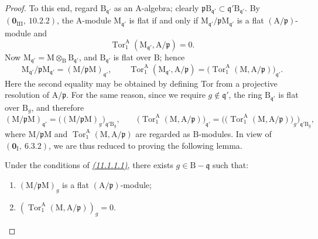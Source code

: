 \begin{proof}
To this end, regard $\mathrm{B}_{\mathfrak{q}'}$ as an $\mathrm{A}$-algebra; clearly
$\mathfrak{p}\mathrm{B}_{\mathfrak{q}'}\subset
\mathfrak{q}'\mathrm{B}_{\mathfrak{q}'}$. By
$(\mathbf{0}_{\mathrm{III}},~10.2.2)$, the $\mathrm{A}$-module
$\mathrm{M}_{\mathfrak{q}'}$ is flat if and only if
$\mathrm{M}_{\mathfrak{q}'}/\mathfrak{p}\mathrm{M}_{\mathfrak{q}'}$ is a
flat $(\mathrm{A}/\mathfrak{p})$-module and
\[
  \operatorname{Tor}_1^\mathrm{A}
  (\mathrm{M}_{\mathfrak{q}'},\mathrm{A}/\mathfrak{p})=0.
\]
Now $\mathrm{M}_{\mathfrak{q}'}=
\mathrm{M}\otimes_{\mathrm{B}}\mathrm{B}_{\mathfrak{q}'}$, and
$\mathrm{B}_{\mathfrak{q}'}$ is flat over $\mathrm{B}$; hence
\[
  \mathrm{M}_{\mathfrak{q}'}/\mathfrak{p}\mathrm{M}_{\mathfrak{q}'}
    =(\mathrm{M}/\mathfrak{p}\mathrm{M})_{\mathfrak{q}'},
  \qquad
  \operatorname{Tor}_1^\mathrm{A}
  (\mathrm{M}_{\mathfrak{q}'},\mathrm{A}/\mathfrak{p})
    =\bigl(\operatorname{Tor}_1^\mathrm{A}
      (\mathrm{M},\mathrm{A}/\mathfrak{p})\bigr)_{\mathfrak{q}'}.
\]
Here the second equality may be obtained by defining Tor from a projective
resolution of $\mathrm{A}/\mathfrak{p}$. For the same reason, since we require
$g\notin\mathfrak{q}'$, the ring $\mathrm{B}_{\mathfrak{q}'}$ is flat over
$\mathrm{B}_g$, and therefore
\[
  (\mathrm{M}/\mathfrak{p}\mathrm{M})_{\mathfrak{q}'}
    =\bigl((\mathrm{M}/\mathfrak{p}\mathrm{M})_g
      \bigr)_{\mathfrak{q}'\mathrm{B}_g},
  \qquad
  \bigl(\operatorname{Tor}_1^\mathrm{A}
      (\mathrm{M},\mathrm{A}/\mathfrak{p})\bigr)_{\mathfrak{q}'}
    =\bigl(\bigl(\operatorname{Tor}_1^\mathrm{A}
      (\mathrm{M},\mathrm{A}/\mathfrak{p})\bigr)_g
      \bigr)_{\mathfrak{q}'\mathrm{B}_g},
\]
where $\mathrm{M}/\mathfrak{p}\mathrm{M}$ and
$\operatorname{Tor}_1^\mathrm{A}
(\mathrm{M},\mathrm{A}/\mathfrak{p})$ are regarded as
$\mathrm{B}$-modules. In view of $(\mathbf{0}_\mathrm{I},~6.3.2)$, we are
thus reduced to proving the following lemma.

\begin{lemma}[11.1.1.2]
\label{IV.11.1.1.2}
Under the conditions of \emph{{\hyperlink{ega4.c04.sec.11-1-1-1}{(11.1.1.1)}}}, there exists $g\in\mathrm{B}-\mathfrak{q}$ such that:
\begin{enumerate}[label=\emph{\roman*)}]
  \item $(\mathrm{M}/\mathfrak{p}\mathrm{M})_g$ is a flat $(\mathrm{A}/\mathfrak{p})$-module;
  \item $(\operatorname{Tor}_1^\mathrm{A}(\mathrm{M},\mathrm{A}/\mathfrak{p}))_g=0$.
\end{enumerate}
\end{lemma}


\end{proof}
